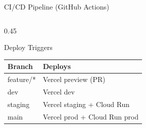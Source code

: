 \documentclass[10pt,aspectratio=169,t]{beamer}
\begin{document}
\begin{frame}{CI/CD Pipeline (GitHub Actions)}
\begin{columns}
\begin{column}{0.45\paperwidth}
      \begin{block}{Deploy Triggers}
        \begin{tabular}{ll}
          \toprule
          Branch & Deploys \\
          \midrule
          feature/* & Vercel preview (PR) \\
          dev & Vercel dev \\
          staging & Vercel staging + Cloud Run \\
          main & Vercel prod + Cloud Run prod \\
          \bottomrule
        \end{tabular}
      \end{block}

    \end{column}

  \end{columns}

\end{frame}
\end{document}
